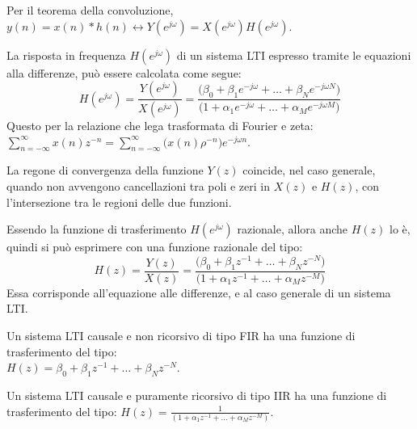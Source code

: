 Per il teorema della convoluzione, $y(n) = x(n) * h(n) \leftrightarrow Y(e^{j\omega}) = X(e^{j\omega})H(e^{j\omega})$.

La risposta in frequenza $H(e^{j\omega})$ di un sistema LTI espresso tramite le equazioni alla differenze, può essere calcolata come segue:
$$H(e^{j\omega}) = \frac{Y(e^{j\omega})}{X(e^{j\omega})} = \frac{\big(\beta_0 + \beta_1e^{-j\omega} + \ldots + \beta_Ne^{-j\omega N}\big)}{\big(1 + \alpha_1e^{-j\omega} + \ldots + \alpha_Me^{-j\omega M}\big)}$$
Questo per la relazione che lega trasformata di Fourier e zeta: \\
$\sum_{n=-\infty}^{\infty} x(n)z^{-n} = \sum_{n=-\infty}^{\infty} \big(x(n)\rho^{-n}\big)e^{-j\omega n}$.

La regone di convergenza della funzione $Y(z)$ coincide, nel caso generale, quando non avvengono cancellazioni tra poli e zeri in $X(z)$ e $H(z)$, con l'intersezione tra le regioni delle due funzioni.

Essendo la funzione di trasferimento $H(e^{j\omega})$ razionale, allora anche $H(z)$ lo è, quindi si può esprimere con una funzione razionale del tipo:
$$H(z) = \frac{Y(z)}{X(z)} = \frac{\big(\beta_0 + \beta_1z^{-1} + \ldots + \beta_Nz^{-N}\big)}{\big(1 + \alpha_1z^{-1} + \ldots + \alpha_Mz^{-M}\big)}$$
Essa corrisponde all'equazione alle differenze, e al caso generale di un sistema LTI.

Un sistema LTI causale e non ricorsivo di tipo FIR ha una funzione di trasferimento del tipo: \\
$H(z) = \beta_0 + \beta_1z^{-1} + \ldots + \beta_Nz^{-N}$.

Un sistema LTI causale e puramente ricorsivo di tipo IIR ha una funzione di trasferimento del tipo:
$H(z) = \frac{1}{(1 + \alpha_1z^{-1} + \ldots + \alpha_Mz^{-M})}$.

